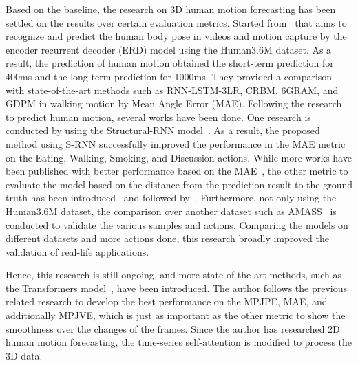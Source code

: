 Based on the baseline, the research on 3D human motion forecasting has been settled on the results over certain evaluation metrics. Started from~\cite{fragkiadaki2015recurrent} that aims to recognize and predict the human body pose in videos and motion capture by the encoder recurrent decoder (ERD) model using the Human3.6M dataset. As a result, the prediction of human motion obtained the short-term prediction for 400ms and the long-term prediction for 1000ms. They provided a comparison with state-of-the-art methods such as RNN-LSTM-3LR, CRBM, 6GRAM, and GDPM in walking motion by Mean Angle Error (MAE). Following the research to predict human motion, several works have been done. One research is conducted by using the Structural-RNN model~\cite{jain2016}. As a result, the proposed method using S-RNN successfully improved the performance in the MAE metric on the Eating, Walking, Smoking, and Discussion actions. While more works have been published with better performance based on the MAE~\cite{motionmixer2022}, the other metric to evaluate the model based on the distance from the prediction result to the ground truth has been introduced~\cite{Sofianos2021} and followed by~\cite{motionmixer2022}. Furthermore, not only using the Human3.6M dataset, the comparison over another dataset such as AMASS~\cite{AMASS2019} is conducted to validate the various samples and actions.
Comparing the models on different datasets and more actions done, this research broadly improved the validation of real-life applications.

Hence, this research is still ongoing, and more state-of-the-art methods, such as the Transformers model~\cite{vaswani2017}, have been introduced. The author follows the previous related research to develop the best performance on the MPJPE, MAE, and additionally MPJVE, which is just as important as the other metric to show the smoothness over the changes of the frames. Since the author has researched 2D human motion forecasting, the time-series self-attention is modified to process the 3D data.

